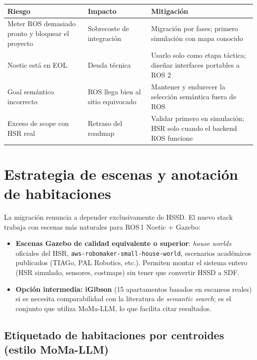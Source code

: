 \documentclass[11pt,a4paper]{article}
\begin{document}
\begin{center}
\begin{tabular}{>{\raggedright\arraybackslash}p{4.2cm} >{\raggedright\arraybackslash}p{5.2cm} >{\raggedright\arraybackslash}p{5.2cm}}
\toprule
\textbf{Riesgo} & \textbf{Impacto} & \textbf{Mitigación} \\
\midrule
Meter ROS demasiado pronto y bloquear el proyecto & Sobrecoste de integración & Migración por fases; primero simulación con mapa conocido \\
\addlinespace
Noetic está en EOL & Deuda técnica & Usarlo solo como etapa táctica; diseñar interfaces portables a ROS 2 \\
\addlinespace
Goal semántico incorrecto & ROS llega bien al sitio equivocado & Mantener y endurecer la selección semántica fuera de ROS \\
\addlinespace
Exceso de scope con HSR real & Retraso del roadmap & Validar primero en simulación; HSR solo cuando el backend ROS funcione \\
\bottomrule
\end{tabular}
\end{center}

\section{Estrategia de escenas y anotación de habitaciones}

La migración renuncia a depender exclusivamente de HSSD. El nuevo stack
trabaja con escenas más naturales para ROS\,1 Noetic + Gazebo:

\begin{itemize}
  \item \textbf{Escenas Gazebo de calidad equivalente o superior}: \emph{house
        worlds} oficiales del HSR, \texttt{aws-robomaker-small-house-world},
        escenarios académicos publicados (TIAGo, PAL Robotics, etc.). Permiten
        montar el sistema entero (HSR simulado, sensores, costmaps) sin tener
        que convertir HSSD a SDF.
  \item \textbf{Opción intermedia: iGibson} (15 apartamentos basados en
        escaneos reales) si se necesita comparabilidad con la literatura de
        \emph{semantic search}; es el conjunto que utiliza MoMa-LLM, lo que
        facilita citar resultados.
\end{itemize}

\subsection*{Etiquetado de habitaciones por centroides (estilo MoMa-LLM)}
\end{document}

